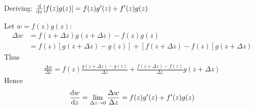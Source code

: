 \documentclass[12pt, english]{book}
\makeatletter
\renewenvironment{proof}[1][\proofname]{\par
	\pushQED{\qed}%
	\normalfont \topsep6\p@\@plus6\p@\relax
	\list{}{%
		\settowidth{\leftmargin}{\itshape\proofname:\hskip\labelsep}%
		\setlength{\labelwidth}{0pt}%
		\setlength{\itemindent}{-\leftmargin}%
	}%
	\item[\hskip\labelsep\itshape#1\@addpunct{:}]\ignorespaces
	}{ \popQED\endlist\@endpefalse}
\makeatother
\begin{document}
	\begin{proof}
		Deriving: \( \dv{z}[f(z)g(z)] = f(z)g'(z) + f'(z)g(z) \)
		
		Let \(w = f(z) g(z)\): 
		\begin{align*}
			\Delta w &= f(z + \Delta z) g(z + \Delta z ) - f(z) g(z)\\
				&=f(z)[g(z + \Delta z) - g(z)] + [f(z + \Delta z) - f(z)] g(z + \Delta z)
		\end{align*}
		Thus
		\begin{align*}
			\frac{\Delta w}{\Delta z}
			= f(z)\frac{g(z + \Delta z) - g(z)}{\Delta z} + \frac{f(z + \Delta z) - f(z)}{\Delta z} g(z + \Delta z)
		\end{align*}
		Hence
		\begin{align*}
			\dv{w}{z} =	\lim_{\Delta z \rightarrow 0} \frac{\Delta w}{\Delta z} = f(z)g'(z) + f'(z)g(z)
		\end{align*}
	\end{proof}
	
\end{document}
